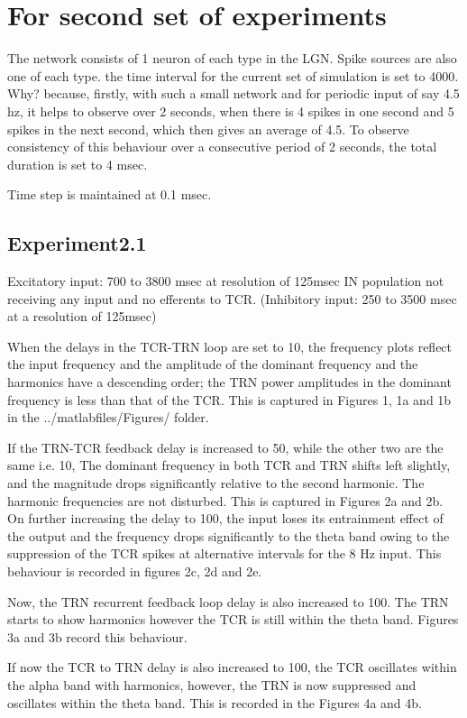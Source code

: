\documentclass[11pt,a4paper]{article}
\begin{document}
\section{For second set of experiments}
\label{sec:2}
The network consists of 1 neuron of each type in the LGN. Spike sources are also one of each type. the time interval for the current set of simulation is set to 4000. Why? because, firstly, with such a small network and for periodic input of say 4.5 hz, it helps to observe over 2 seconds, when there is 4 spikes in one second and 5 spikes in the next second, which then gives an average of 4.5. To observe consistency of this behaviour over a consecutive period of 2 seconds, the total duration is set to 4 msec. 

Time step is maintained at 0.1 msec.

\subsection{Experiment2.1}
\label{sec:21}
Excitatory input: 700 to 3800 msec at resolution of 125msec
IN population not receiving any input and no efferents to TCR.
(Inhibitory input: 250 to 3500 msec at a resolution of 125msec)

When the delays in the TCR-TRN loop are set to 10, the frequency plots reflect the input frequency and the amplitude of the dominant frequency and the harmonics have a descending order; the TRN power amplitudes in the dominant frequency is less than that of the TCR. This is captured in Figures 1, 1a and 1b in the ../matlabfiles/Figures/ folder.

If the TRN-TCR feedback delay is increased to 50, while the other two are the same i.e. 10, The dominant frequency in both TCR and TRN shifts left slightly, and the magnitude drops significantly relative to the second harmonic. The harmonic frequencies are not disturbed. This is captured in Figures 2a and 2b. On further increasing the delay to 100, the input loses its entrainment effect of the output and the frequency drops significantly to the theta band owing to the suppression of the TCR spikes at alternative intervals for the 8 Hz input. This behaviour is recorded in figures 2c, 2d and 2e.

Now, the TRN recurrent feedback loop delay is also increased to 100. The TRN starts to show harmonics however the TCR is still within the theta band. Figures 3a and 3b record this behaviour.

If now the TCR to TRN delay is also increased to 100, the TCR oscillates within the alpha band with harmonics, however, the TRN is now suppressed and oscillates within the theta band. This is recorded in the Figures 4a and 4b.
\end{document}
